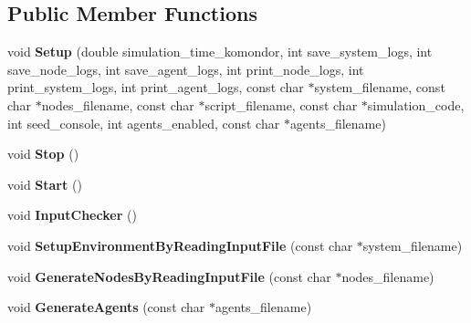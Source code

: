 \subsection*{Public Member Functions}
\begin{DoxyCompactItemize}
\item 
\mbox{\label{classcompcxx__Komondor__27_aae1cba60a8e176c95ec24d84f1e484ae}} 
void {\bfseries Setup} (double simulation\+\_\+time\+\_\+komondor, int save\+\_\+system\+\_\+logs, int save\+\_\+node\+\_\+logs, int save\+\_\+agent\+\_\+logs, int print\+\_\+node\+\_\+logs, int print\+\_\+system\+\_\+logs, int print\+\_\+agent\+\_\+logs, const char $\ast$system\+\_\+filename, const char $\ast$nodes\+\_\+filename, const char $\ast$script\+\_\+filename, const char $\ast$simulation\+\_\+code, int seed\+\_\+console, int agents\+\_\+enabled, const char $\ast$agents\+\_\+filename)
\item 
\mbox{\label{classcompcxx__Komondor__27_a74a60c428bf2dce5a0cec25d7341c5fd}} 
void {\bfseries Stop} ()
\item 
\mbox{\label{classcompcxx__Komondor__27_ad6ca963a42e5beff600747d1249b9360}} 
void {\bfseries Start} ()
\item 
\mbox{\label{classcompcxx__Komondor__27_a6735e289f86ba3288607281f4d8e8cd0}} 
void {\bfseries Input\+Checker} ()
\item 
\mbox{\label{classcompcxx__Komondor__27_a9158afcdccfefdebebc4e25920e28c78}} 
void {\bfseries Setup\+Environment\+By\+Reading\+Input\+File} (const char $\ast$system\+\_\+filename)
\item 
\mbox{\label{classcompcxx__Komondor__27_a85df144f45a28b3abc84ed45447913fb}} 
void {\bfseries Generate\+Nodes\+By\+Reading\+Input\+File} (const char $\ast$nodes\+\_\+filename)
\item 
\mbox{\label{classcompcxx__Komondor__27_a9886605add430e49e119ad5a91438151}} 
void {\bfseries Generate\+Agents} (const char $\ast$agents\+\_\+filename)
\item 
\mbox{\label{classcompcxx__Komondor__27_a2c99bfcd07b40a577c136e5396e9ac4a}} 

\end{DoxyCompactItemize}
